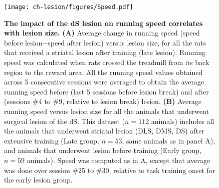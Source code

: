 \begin{figure}[bth!]
  \begin{center}
    \texttt{[image: ch-lesion/figures/Speed.pdf]}
    \caption[Speed-Lesion Size Correlation]
    {\textbf{The impact of the dS lesion on running speed correlates with lesion size.}
    \textbf{(A)} Average change in running speed (speed before lesion$-$speed after lesion) versus lesion size, for all the rats that received a striatal lesion after training (late lesion).
    Running speed was calculated when rats crossed the treadmill from its back region to the reward area.
    All the running speed values obtained across 5 consecutive sessions were averaged to obtain the average running speed before (last 5 sessions before lesion break) and after (sessions \#4 to \#9, relative to lesion break) lesion. 
    \textbf{(B)} Average running speed versus lesion size for all the animals that underwent surgical lesion of the dS.
    This dataset ($n=112$ animals) includes all the animals that underwent striatal lesion (DLS, DMS, DS) after extensive training (Late group, $n=53$, same animals as in panel A), and animals that underwent lesion before training (Early group, $n=59$ animals).
    Speed was computed as in A, except that average was done over session \#25 to \#30, relative to task training onset for the early lesion group.
    }
    \label{fig:lesion:spd}
  \end{center}
\end{figure}